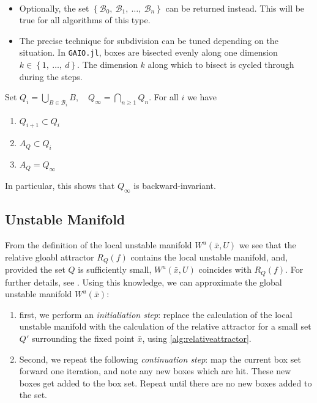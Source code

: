 \begin{remark}\
    \begin{itemize}
        \item Optionally, the set 
        $\left\{ \mathcal{B}_0,\ \mathcal{B}_1,\ \dotsc,\ \mathcal{B}_n \right\}$
        can be returned instead. This will be true for all algorithms of this type.
        \item The precise technique for subdivision can be tuned depending on the situation. 
        In \texttt{GAIO.jl}, boxes are bisected evenly along one dimension 
        $k \in \left\{1,\ \dotsc,\ d\right\}$. The dimension $k$ along which to bisect is 
        cycled through during the steps. \\
    \end{itemize}
\end{remark}

\begin{proposition}\label{thm:cover}
    \cite*{algGAIO,subalg} Set 
    $Q_i = \bigcup_{B \in \mathcal{B}_i} B,\quad Q_\infty = \bigcap_{n \geq 1} Q_n$. 
    For all $i$ we have

    \begin{enumerate}
        \item $Q_{i+1} \subset Q_i$
        \item $A_Q \subset Q_i$ 
        \item $A_Q = Q_\infty$
    \end{enumerate}

    In particular, this shows that $Q_\infty$ is backward-invariant. 
\end{proposition}


\subsection{Unstable Manifold}

From the definition of the local unstable manifold $W^u(\bar{x}, U)$ we see that the 
relative gloabl attractor $R_Q(f)$ contains the local unstable manifold, and, provided the 
set $Q$ is sufficiently small, $W^u(\bar{x}, U)$ coincides with $R_Q(f)$. For further 
details, see \cite*{manifold, geodynbook}. Using this knowledge, we can approximate the 
global unstable manifold $W^u(\bar{x})$: 

\begin{enumerate}
    \item first, we perform an \emph{initialiation step}: replace the calculation of 
    the local unstable manifold with the calculation of the relative
    attractor for a small set $Q'$ surrounding the fixed point $\bar{x}$, using 
    \autoref{alg:relativeattractor}. 
    \item Second, we repeat the following \emph{continuation step}: map 
    the current box set forward one iteration, and note any new boxes which are hit. These 
    new boxes get added to the box set. Repeat until there are no new boxes
    added to the set. 
\end{enumerate}

